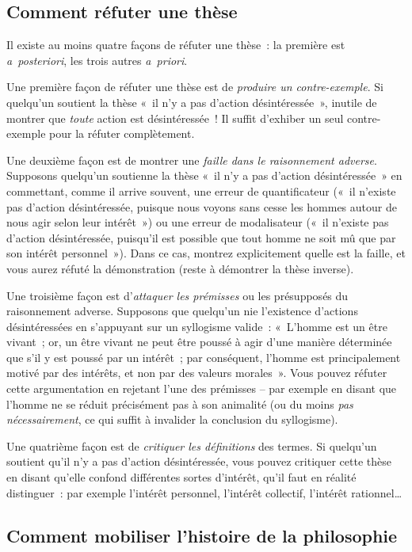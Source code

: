 \documentclass[a4paper]{article}
\begin{document}
\subsection{Comment réfuter une thèse}
\label{sec-3-5}


Il existe au moins quatre façons de réfuter une thèse : la première est
\emph{a posteriori}, les trois autres \emph{a priori}.

Une première façon de réfuter une thèse est de \emph{produire un contre-exemple}. Si quelqu'un soutient la thèse « il n'y a pas d'action
désintéressée », inutile de montrer que \emph{toute} action est
désintéressée ! Il suffit d'exhiber un seul contre-exemple pour la
réfuter complètement.

Une deuxième façon est de montrer une \emph{faille dans le raisonnement adverse}. Supposons quelqu'un soutienne la thèse « il n'y a pas d'action
désintéressée » en commettant, comme il arrive souvent, une erreur de
quantificateur (« il n'existe pas d'action désintéressée, puisque nous
voyons sans cesse les hommes autour de nous agir selon leur intérêt ») ou
une erreur de modalisateur (« il n'existe pas d'action désintéressée,
puisqu'il est possible que tout homme ne soit mû que par son intérêt
personnel »). Dans ce cas, montrez explicitement quelle est la faille, et
vous aurez réfuté la démonstration (reste à démontrer la thèse inverse).

Une troisième façon est d'\emph{attaquer les prémisses} ou les présupposés du
raisonnement adverse. Supposons que quelqu'un nie l'existence d'actions
désintéressées en s'appuyant sur un syllogisme valide : « L'homme est un
être vivant ; or, un être vivant ne peut être poussé à agir d'une
manière déterminée que s'il y est poussé par un intérêt ; par
conséquent, l'homme est principalement motivé par des intérêts, et non
par des valeurs morales ». Vous pouvez réfuter cette argumentation en
rejetant l'une des prémisses -- par exemple en disant que l'homme ne se
réduit précisément pas à son animalité (ou du moins \emph{pas nécessairement}, ce qui suffit à invalider la conclusion du syllogisme).

Une quatrième façon est de \emph{critiquer les définitions} des termes. Si
quelqu'un soutient qu'il n'y a pas d'action désintéressée, vous pouvez
critiquer cette thèse en disant qu'elle confond différentes sortes
d'intérêt, qu'il faut en réalité distinguer : par exemple l'intérêt
personnel, l'intérêt collectif, l'intérêt rationnel\ldots{}
\subsection{Comment mobiliser l'histoire de la philosophie}
\label{sec-3-6}
\end{document}
